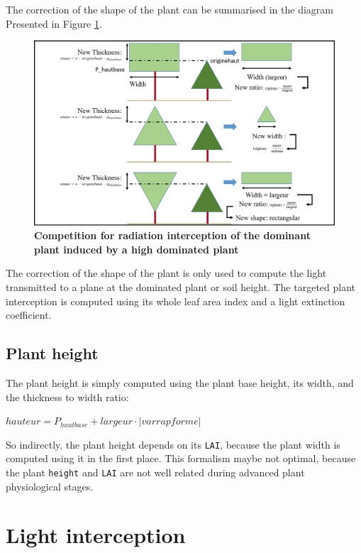 \documentclass[
]{book}
\begin{document}
The correction of the shape of the plant can be summarised in the diagram Presented in Figure \ref{fig:Comprad}.

\begin{figure}
\centering
\includegraphics{img/Light-interception-dominant-2.png}
\caption{\label{fig:Comprad}\textbf{Competition for radiation interception of the dominant plant induced by a high dominated plant}}
\end{figure}

The correction of the shape of the plant is only used to compute the light transmitted to a plane at the dominated plant or soil height. The targeted plant interception is computed using its whole leaf area index and a light extinction coefficient.

\hypertarget{plant-height}{%
\subsection{Plant height}\label{plant-height}}

The plant height is simply computed using the plant base height, its width, and the thickness to width ratio:

\(hauteur=P_{hautbase}+largeur\cdot\left|varrapforme\right|\)

So indirectly, the plant height depends on its \texttt{LAI}, because the plant width is computed using it in the first place.
This formalism maybe not optimal, because the plant \texttt{height} and \texttt{LAI} are not well related during advanced plant physiological stages.

\hypertarget{light-interception}{%
\section{Light interception}\label{light-interception}}
\end{document}
